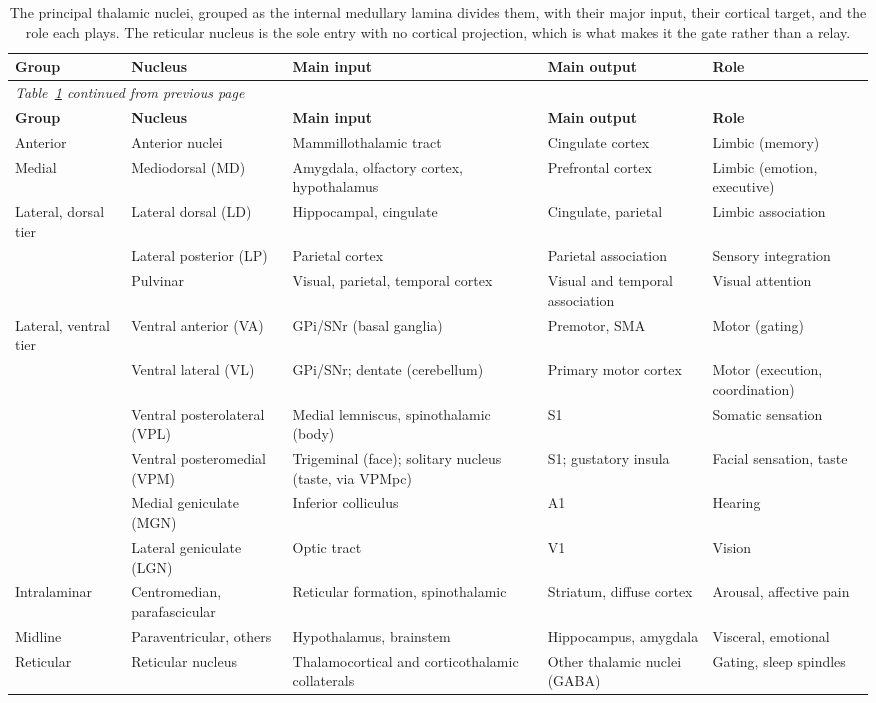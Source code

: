 \documentclass[11pt]{article}
\begin{document}
{\footnotesize
\renewcommand{\arraystretch}{1.3}
\begin{longtable}{p{2.7cm} p{2.9cm} p{3.3cm} p{2.6cm} p{2.2cm}}
\caption{The principal thalamic nuclei, grouped as the internal medullary lamina divides them, with their major input, their cortical target, and the role each plays. The reticular nucleus is the sole entry with no cortical projection, which is what makes it the gate rather than a relay.}
\label{tab:thalamus} \\
\toprule
\textbf{Group} & \textbf{Nucleus} & \textbf{Main input} & \textbf{Main output} & \textbf{Role} \\
\midrule
\endfirsthead
\multicolumn{5}{l}{\emph{\small Table~\ref{tab:thalamus} continued from previous page}} \\
\toprule
\textbf{Group} & \textbf{Nucleus} & \textbf{Main input} & \textbf{Main output} & \textbf{Role} \\
\midrule
\endhead
\bottomrule
\endfoot
\bottomrule
\endlastfoot
Anterior & Anterior nuclei & Mammillothalamic tract & Cingulate cortex & Limbic (memory) \\
\midrule
Medial & Mediodorsal (MD) & Amygdala, olfactory cortex, hypothalamus & Prefrontal cortex & Limbic (emotion, executive) \\
\midrule
Lateral, dorsal tier & Lateral dorsal (LD) & Hippocampal, cingulate & Cingulate, parietal & Limbic association \\
 & Lateral posterior (LP) & Parietal cortex & Parietal association & Sensory integration \\
 & Pulvinar & Visual, parietal, temporal cortex & Visual and temporal association & Visual attention \\
\midrule
Lateral, ventral tier & Ventral anterior (VA) & GPi/SNr (basal ganglia) & Premotor, SMA & Motor (gating) \\
 & Ventral lateral (VL) & GPi/SNr; dentate (cerebellum) & Primary motor cortex & Motor (execution, coordination) \\
 & Ventral posterolateral (VPL) & Medial lemniscus, spinothalamic (body) & S1 & Somatic sensation \\
 & Ventral posteromedial (VPM) & Trigeminal (face); solitary nucleus (taste, via VPMpc) & S1; gustatory insula & Facial sensation, taste \\
 & Medial geniculate (MGN) & Inferior colliculus & A1 & Hearing \\
 & Lateral geniculate (LGN) & Optic tract & V1 & Vision \\
\midrule
Intralaminar & Centromedian, parafascicular & Reticular formation, spinothalamic & Striatum, diffuse cortex & Arousal, affective pain \\
\midrule
Midline & Paraventricular, others & Hypothalamus, brainstem & Hippocampus, amygdala & Visceral, emotional \\
\midrule
Reticular & Reticular nucleus & Thalamocortical and corticothalamic collaterals & Other thalamic nuclei (GABA) & Gating, sleep spindles \\
\end{longtable}
}
\end{document}
